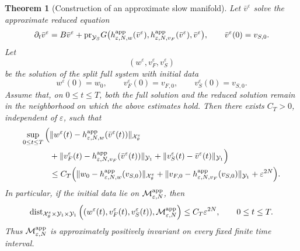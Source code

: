 \documentclass[11pt]{article}
\newtheorem{theorem}{Theorem}[section]
\theoremstyle{definition}
\theoremstyle{remark}
\numberwithin{equation}{section}
\newcommand{\mc}[1]{\mathcal{#1}}
\newcommand{\pr}{\textnormal{pr}}
\begin{document}
\begin{theorem}[Construction of an approximate slow manifold]
Let \(\bar v^\varepsilon\) solve the approximate reduced equation
\[
\partial_t\bar v^\varepsilon
=
B\bar v^\varepsilon
+
\pr_{\mc Y_S}
G\bigl(
h_{\varepsilon,N,w}^{\rm app}(\bar v^\varepsilon),
h_{\varepsilon,N,v_F}^{\rm app}(\bar v^\varepsilon),
\bar v^\varepsilon
\bigr),
\qquad
\bar v^\varepsilon(0)=v_{S,0}.
\]
Let
\[
(w^\varepsilon,v_F^\varepsilon,v_S^\varepsilon)
\]
be the solution of the split full system with initial data
\[
w^\varepsilon(0)=w_0,
\qquad
v_F^\varepsilon(0)=v_{F,0},
\qquad
v_S^\varepsilon(0)=v_{S,0}.
\]
Assume that, on \(0\le t\le T\), both the full solution and the reduced
solution remain in the neighborhood on which the above estimates hold. Then
there exists \(C_T>0\), independent of \(\varepsilon\), such that
\[
\begin{aligned}
\sup_{0\le t\le T}
\Big(
&
\|w^\varepsilon(t)
-
h_{\varepsilon,N,w}^{\rm app}(\bar v^\varepsilon(t))\|_{\mc X_\theta^\varepsilon}
\\
&+
\|v_F^\varepsilon(t)
-
h_{\varepsilon,N,v_F}^{\rm app}(\bar v^\varepsilon(t))\|_{\mc Y_1}
+
\|v_S^\varepsilon(t)-\bar v^\varepsilon(t)\|_{\mc Y_1}
\Big)
\\
&\le
C_T
\Big(
\|w_0-h_{\varepsilon,N,w}^{\rm app}(v_{S,0})\|_{\mc X_\theta^\varepsilon}
+
\|v_{F,0}-h_{\varepsilon,N,v_F}^{\rm app}(v_{S,0})\|_{\mc Y_1}
+
\varepsilon^{2N}
\Big).
\end{aligned}
\]
In particular, if the initial data lie on \(\mathcal M_{\varepsilon,N}^{\rm app}\),
then
\[
\operatorname{dist}_{\mc X_\theta^\varepsilon\times\mc Y_1\times\mc Y_1}
\Big(
(w^\varepsilon(t),v_F^\varepsilon(t),v_S^\varepsilon(t)),
\mathcal M_{\varepsilon,N}^{\rm app}
\Big)
\le
C_T\varepsilon^{2N},
\qquad
0\le t\le T.
\]
Thus \(\mathcal M_{\varepsilon,N}^{\rm app}\) is approximately positively
invariant on every fixed finite time interval.
\end{theorem}
\end{document}
